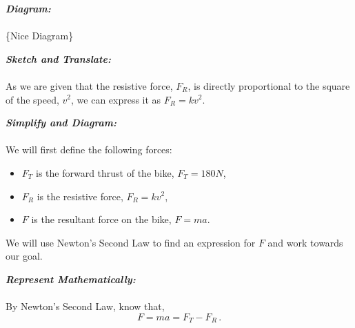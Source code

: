 %
%
%


\begin{subquestions}
	
\subquestion

\textbf{\textit{Diagram:}} \\ \\
\{Nice Diagram\}


\subquestion

\textbf{\textit{Sketch and Translate:}} \\ \\
As we are given that the resistive force, $F_R$, is directly proportional to the square of the speed, $v^2$, we can express it as $F_R=kv^2$.




\textbf{\textit{Simplify and Diagram:}} \\ \\
We will first define the following forces:
\begin{itemize}
	\item $F_T$ is the forward thrust of the bike, $F_T=180N$,
	\item $F_R$ is the resistive force, $F_R=kv^2$,
	\item $F$ is the resultant force on the bike, $F=ma$.
\end{itemize}
We will use Newton's Second Law to find an expression for $F$ and work towards our goal.




\textbf{\textit{Represent Mathematically:}} \\ \\
By Newton's Second Law, know that,
\begin{equation}
	F = ma = F_T - F_R \label{2006:q6:FEqn1} \,.
\end{equation}


\end{subquestions}
